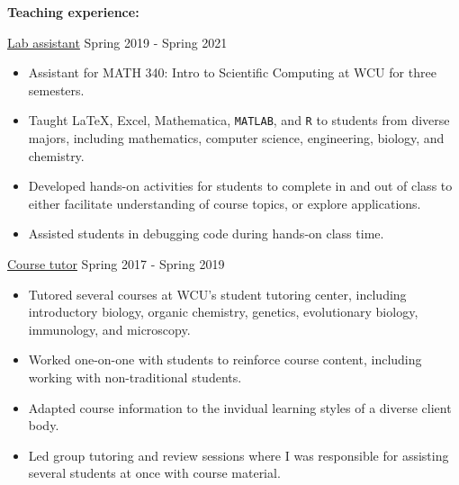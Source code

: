 \textbf{Teaching experience:}

\ul{Lab assistant} \hfill Spring 2019 - Spring 2021 
\begin{itemize}
\item Assistant for MATH 340: Intro to Scientific Computing at WCU for three semesters.
\item Taught \LaTeX{}, Excel, Mathematica, \texttt{MATLAB}, and \texttt{R} to students from diverse majors, including mathematics, computer science, engineering, biology, and chemistry.
\item Developed hands-on activities for students to complete in and out of class to either facilitate understanding of course topics, or explore applications.
\item Assisted students in debugging code during hands-on class time.
\end{itemize}

\ul{Course tutor} \hfill Spring 2017 - Spring 2019
\begin{itemize}
\item Tutored several courses at WCU's student tutoring center, including introductory biology, organic chemistry, genetics, evolutionary biology, immunology, and microscopy.
\item Worked one-on-one with students to reinforce course content, including working with non-traditional students.
\item Adapted course information to the invidual learning styles of a diverse client body.
\item Led group tutoring and review sessions where I was responsible for assisting several students at once with course material.
\end{itemize}